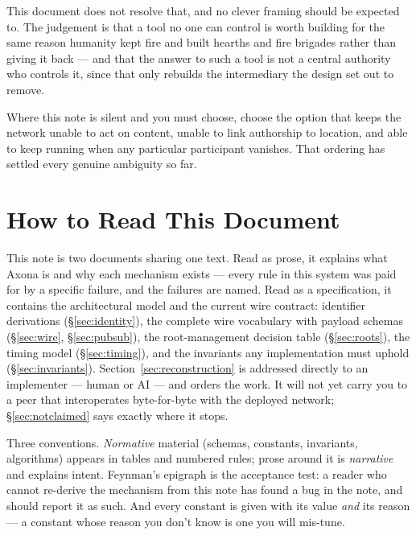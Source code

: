 \documentclass[nobib]{tufte-handout}
\begin{document}
This document does not resolve that, and no clever framing should be
expected to. The judgement is that a tool no one can control is worth
building for the same reason humanity kept fire and built hearths and fire
brigades rather than giving it back --- and that the answer to such a tool is
not a central authority who controls it, since that only rebuilds the
intermediary the design set out to remove.

Where this note is silent and you must choose, choose the option that keeps
the network unable to act on content, unable to link authorship to location,
and able to keep running when any particular participant vanishes. That
ordering has settled every genuine ambiguity so far.

\section{How to Read This Document}

This note is two documents sharing one text. Read as prose, it explains
what Axona is and why each mechanism exists --- every rule in this system
was paid for by a specific failure, and the failures are named. Read as a
specification, it contains the architectural model and the current wire
contract: identifier derivations
(\S\ref{sec:identity}), the complete wire vocabulary with payload schemas
(\S\ref{sec:wire}, \S\ref{sec:pubsub}), the root-management decision table
(\S\ref{sec:roots}), the timing model (\S\ref{sec:timing}), and the
invariants any implementation must uphold (\S\ref{sec:invariants}).
Section~\ref{sec:reconstruction} is addressed directly to an implementer
--- human or AI --- and orders the work. It will not yet carry you to a
peer that interoperates byte-for-byte with the deployed network;
\S\ref{sec:notclaimed} says exactly where it stops.

Three conventions. \emph{Normative} material (schemas, constants,
invariants, algorithms) appears in tables and numbered rules; prose around
it is \emph{narrative} and explains intent. Feynman's epigraph is the
acceptance test: a reader who cannot re-derive the mechanism from this
note has found a bug in the note, and should report it as such. And
every constant is given with its value \emph{and} its reason --- a
constant whose reason you don't know is one you will mis-tune.
\end{document}
